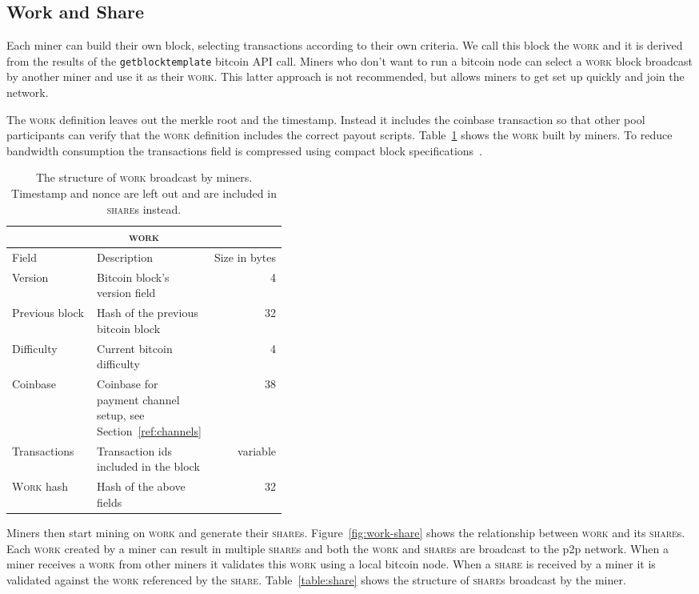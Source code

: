 \documentclass{article}
\begin{document}
\subsection{Work and Share}

Each miner can build their own block, selecting transactions according
to their own criteria. We call this block the \textsc{work} and it is
derived from the results of the \verb|getblocktemplate| bitcoin API
call. Miners who don't want to run a bitcoin node can select a
\textsc{work} block broadcast by another miner and use it as their
\textsc{work}. This latter approach is not recommended, but allows
miners to get set up quickly and join the network.

The \textsc{work} definition leaves out the merkle root and the
timestamp. Instead it includes the coinbase transaction so that other
pool participants can verify that the \textsc{work} definition
includes the correct payout scripts. Table~\ref{table:work} shows the
\textsc{work} built by miners. To reduce bandwidth consumption the
transactions field is compressed using compact block
specifications~\cite{compact-blocks}.

\begin{table}
  \centering
  \begin{tabular}{ lp{0.4\linewidth}r }
    \multicolumn{3}{c}{\textsc{work}} \\
    \hline
    Field & Description & Size in bytes \\
    \hline
    Version & Bitcoin block's version field & 4\\
    Previous block & Hash of the previous bitcoin block & 32 \\
    Difficulty & Current bitcoin difficulty & 4 \\
    Coinbase & Coinbase for payment channel setup, see Section~\ref{ref:channels} & 38 \\
    Transactions & Transaction ids included in the block & variable \\
    \textsc{Work} hash & Hash of the above fields & 32 \\
    \hline
  \end{tabular}
  \caption{The structure of \textsc{work} broadcast by
    miners. Timestamp and nonce are left out and are included in
    \textsc{share}s instead.}\label{table:work}
\end{table}

Miners then start mining on \textsc{work} and generate their
\textsc{share}s. Figure~\ref{fig:work-share} shows the relationship
between \textsc{work} and its \textsc{share}s. Each \textsc{work}
created by a miner can result in multiple \textsc{share}s and both the
\textsc{work} and \textsc{share}s are broadcast to the p2p
network. When a miner receives a \textsc{work} from other miners it
validates this \textsc{work} using a local bitcoin node. When a
\textsc{share} is received by a miner it is validated against the
\textsc{work} referenced by the
\textsc{share}. Table~\ref{table:share} shows the structure of
\textsc{share}s broadcast by the miner.
\end{document}
